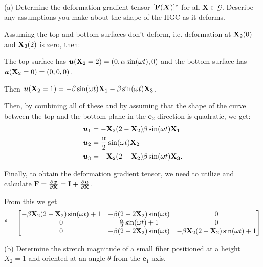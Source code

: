 \begin{figure}[h!]
\centering
{}
\end{figure}

\medskip
(a) Determine the deformation gradient tensor $[\mathbf{F}(\bm{X})]^{\bm{e}}$ for all $\bm{X}\in \mathcal{G}$. 
Describe any assumptions you make about the shape of the HGC as it deforms.

Assuming the top and bottom surfaces don't deform, i.e. deformation at $\mathbf{X}_2 (0)$ and $\mathbf{X}_2 (2)$ is zero, then:

The top surface has $\bm{u} (\mathbf{X}_2 = 2) = (0, \alpha \sin (\omega t), 0)$ and the bottom surface has $\bm{u} (\mathbf{X}_2 = 0) = (0, 0, 0)$.

Then $\bm{u} (\mathbf{X}_2 = 1) = -\beta \sin (\omega t) \mathbf{X}_1 - \beta \sin (\omega t) \mathbf{X}_3$.

Then, by combining all of these and by assuming that the shape of the curve between the top and the bottom plane in the $\bm{e}_2$ direction is quadratic, we get:
\begin{align*}
    \bm{u}_1 &= -\mathbf{X}_2 (2-\mathbf{X}_2) \beta \sin (\omega t) \mathbf{X_1}\\
    \bm{u}_2 &= \frac{\alpha}{2} \sin (\omega t) \mathbf{X}_2\\
    \bm{u}_3 &= -\mathbf{X}_2 (2-\mathbf{X}_2) \beta \sin (\omega t) \mathbf{X_3}.
\end{align*}

Finally, to obtain the deformation gradient tensor, we need to utilize and calculate $\mathbf{F} = \frac{\partial \bm{x}}{\partial \mathbf{X}} = \mathbf{I} + \frac{\partial \bm{u}}{\partial \mathbf{X}}$.

From this we get
\begin{equation*}
  [\bn{F} (\bn{X})] ^e =   
\begin{bmatrix}
-\beta \bn{X}_2 (2-\bn{X}_2) \sin (\omega t) + 1 & -\beta (2-2\bn{X}_2) \sin(\omega t) & 0\\
0 & \frac{\alpha}{2} \sin (\omega t) +1 & 0\\
0 & -\beta (2-2\bn{X}_2) \sin(\omega t) & -\beta \bn{X}_2 (2-\bn{X}_2) \sin (\omega t) + 1
\end{bmatrix}
\end{equation*}

\medskip
(b) Determine the stretch magnitude of a small fiber positioned at a height $X_2 = 1$ and oriented at an angle $\theta$ from the $\bm{e}_1$ axis.

